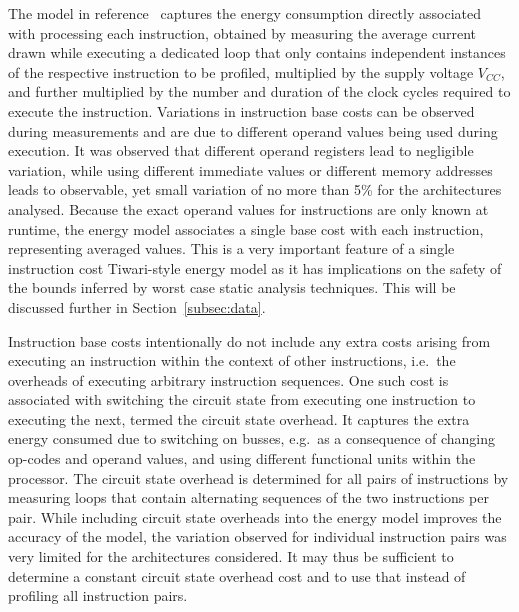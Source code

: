 \documentclass[oneside]{book}
\begin{document}
The model in reference~\cite{Tiwari-embedded-1994} captures the energy consumption
directly associated with processing each instruction, obtained by measuring the
average current drawn while executing a dedicated loop that only contains
independent instances of the respective instruction to be profiled, multiplied
by the supply voltage $V_{CC}$, and further multiplied by the number and
duration of the clock cycles required to execute the instruction.
%
Variations in instruction base costs can be observed during measurements and
are due to different operand values being used during execution. It was observed that
different operand registers lead to negligible variation, while using different
immediate values or different memory addresses leads to observable, yet small
variation of no more than 5\% for the architectures analysed.
%
Because the exact operand values for instructions are only known at runtime,
the energy model associates a single base cost with each instruction,
representing averaged values. This is a very important feature of a single
instruction cost Tiwari-style energy model as it has implications on the safety
of the bounds inferred by worst case static analysis techniques. This will be
discussed further in Section~\ref{subsec:data}.

Instruction base costs intentionally do not include any extra costs arising
from executing an instruction within the context of other instructions, i.e.\
the overheads of executing arbitrary instruction sequences.
%
One such cost is associated with switching the circuit state from executing one
instruction to executing the next, termed the circuit state overhead. It
captures the extra energy consumed due to switching on busses, e.g.\ as a
consequence of changing op-codes and operand values, and using different
functional units within the processor. The circuit state overhead is determined
for all pairs of instructions by measuring loops that contain alternating
sequences of the two instructions per pair.
%
While including circuit state overheads into the energy model improves the
accuracy of the model, the variation observed for individual instruction pairs
was very limited for the architectures considered. It may thus be sufficient to
determine a constant circuit state overhead cost and to use that instead of
profiling all instruction pairs.
\end{document}
